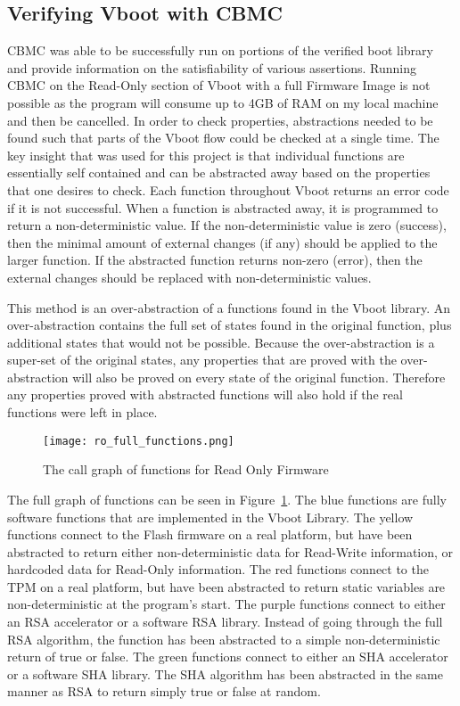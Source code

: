 \documentclass[../report.tex]{subfiles}
\begin{document}
\subsection{Verifying Vboot with CBMC}

CBMC was able to be successfully run on portions of the verified boot library and provide information on the satisfiability of various assertions.
Running CBMC on the Read-Only section of Vboot with a full Firmware Image is not possible as the program will consume up to 4GB of RAM on my local machine and then be cancelled.
In order to check properties, abstractions needed to be found such that parts of the Vboot flow could be checked at a single time.
The key insight that was used for this project is that individual functions are essentially self contained and can be abstracted away based on the properties that one desires to check.
Each function throughout Vboot returns an error code if it is not successful.
When a function is abstracted away, it is programmed to return a
non-deterministic value.
If the non-deterministic value is zero (success), then the minimal amount of external changes (if any) should be applied to the larger function.
If the abstracted function returns non-zero (error), then the external changes should be replaced with non-deterministic values.

This method is an over-abstraction of a functions found in the Vboot library.
An over-abstraction contains the full set of states found in the original function, plus additional states that would not be possible.
Because the over-abstraction is a super-set of the original states, any properties that are proved with the over-abstraction will also be proved on every state of the original function.
Therefore any properties proved with abstracted functions will also hold if the real functions were left in place.

\begin{figure}
  \centering
  \texttt{[image: ro\_full\_functions.png]}
  \caption{The call graph of functions for Read Only Firmware}\label{fig:full_functions}
\end{figure}

The full graph of functions can be seen in Figure~\ref{fig:full_functions}.
The blue functions are fully software functions that are implemented in the Vboot Library.
The yellow functions connect to the Flash firmware on a real platform, but have been abstracted to return either non-deterministic data for Read-Write information, or hardcoded data for Read-Only information.
The red functions connect to the TPM on a real platform, but have been abstracted to return static variables are non-deterministic at the program's start.
The purple functions connect to either an RSA accelerator or a software RSA library. Instead of going through the full RSA algorithm, the function has been abstracted to a simple non-deterministic return of true or false. 
The green functions connect to either an SHA accelerator or a software SHA library.
The SHA algorithm has been abstracted in the same manner as RSA to return simply true or false at random.
\end{document}
